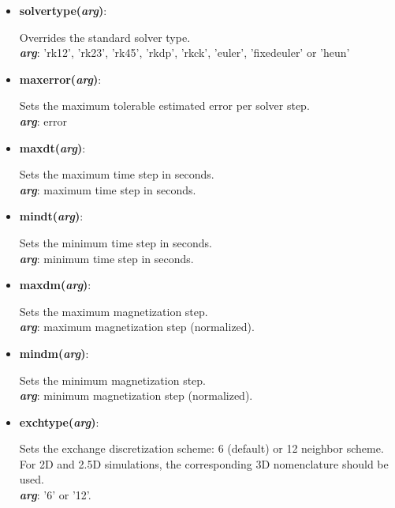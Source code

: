 \begin{itemize}

 \item {\textbf{solvertype(\textit{arg})}:
				\flushright\parbox{0.9 \textwidth}{\vspace{-0.25cm} 
				Overrides the standard solver type.\\
				\textbf{\textit{arg}}: 'rk12', 'rk23', 'rk45', 'rkdp', 'rkck', 'euler', 'fixedeuler' or 'heun' 
				}\flushleft}

 \item {\vspace{-0.4cm}\textbf{maxerror(\textit{arg})}:
				\flushright\parbox{0.9 \textwidth}{\vspace{-0.25cm} 
				Sets the maximum tolerable estimated error per solver step.\\
				\textbf{\textit{arg}}: error
				}\flushleft}

 \item {\vspace{-0.4cm}\textbf{maxdt(\textit{arg})}:
				\flushright\parbox{0.9 \textwidth}{\vspace{-0.25cm} 
				Sets the maximum time step in seconds.\\
				\textbf{\textit{arg}}: maximum time step in seconds.
				}\flushleft}

 \item {\vspace{-0.4cm}\textbf{mindt(\textit{arg})}:
				\flushright\parbox{0.9 \textwidth}{\vspace{-0.25cm} 
				Sets the minimum time step in seconds.\\
				\textbf{\textit{arg}}: minimum time step in seconds.
				}\flushleft}

 \item {\vspace{-0.4cm}\textbf{maxdm(\textit{arg})}:
				\flushright\parbox{0.9 \textwidth}{\vspace{-0.25cm} 
				Sets the maximum magnetization step.\\
				\textbf{\textit{arg}}: maximum magnetization step (normalized).
				}\flushleft}

 \item {\vspace{-0.4cm}\textbf{mindm(\textit{arg})}:
				\flushright\parbox{0.9 \textwidth}{\vspace{-0.25cm} 
				Sets the minimum magnetization step.\\
				\textbf{\textit{arg}}: minimum magnetization step (normalized).
				}\flushleft}

 \item {\vspace{-0.4cm}\textbf{exchtype(\textit{arg})}:
				\flushright\parbox{0.9 \textwidth}{\vspace{-0.25cm} 
				Sets the exchange discretization scheme: 6 (default) or 12 neighbor scheme.  For 2D and 2.5D simulations, the corresponding 3D nomenclature should be used.\\
				\textbf{\textit{arg}}: '6' or '12'.
				}\flushleft}

\end{itemize}


